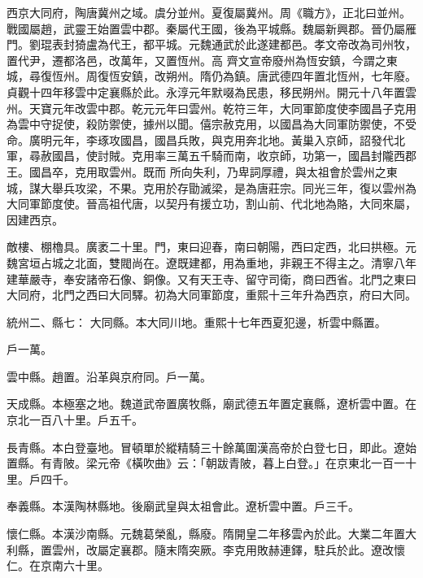 
\begin{pinyinscope}

 西京大同府，陶唐冀州之域。虞分並州。夏復屬冀州。周《職方》，正北曰並州。戰國屬趙，武靈王始置雲中郡。秦屬代王國，後為平城縣。魏屬新興郡。晉仍屬雁門。劉琨表封猗盧為代王，都平城。元魏通武於此遂建都邑。孝文帝改為司州牧，置代尹，遷都洛邑，改萬年，又置恆州。高
 齊文宣帝廢州為恆安鎮，今謂之東城，尋復恆州。周復恆安鎮，改朔州。隋仍為鎮。唐武德四年置北恆州，七年廢。貞觀十四年移雲中定襄縣於此。永淳元年默啜為民患，移民朔州。開元十八年置雲州。天寶元年改雲中郡。乾元元年曰雲州。乾符三年，大同軍節度使李國昌子克用為雲中守捉使，殺防禦使，據州以聞。僖宗赦克用，以國昌為大同軍防禦使，不受命。廣明元年，李琢攻國昌，國昌兵敗，與克用奔北地。黃巢入京師，詔發代北軍，尋赦國昌，使討賊。克用率三萬五千騎而南，收京師，功第一，國昌封隴西郡王。國昌卒，克用取雲州。既而
 所向失利，乃卑詞厚禮，與太祖會於雲州之東城，謀大舉兵攻梁，不果。克用於存勖滅梁，是為唐莊宗。同光三年，復以雲州為大同軍節度使。晉高祖代唐，以契丹有援立功，割山前、代北地為賂，大同來屬，因建西京。



 敵樓、棚櫓具。廣袤二十里。門，東曰迎春，南曰朝陽，西曰定西，北曰拱極。元魏宮垣占城之北面，雙閥尚在。遼既建都，用為重地，非親王不得主之。清寧八年建華嚴寺，奉安諸帝石像、銅像。又有天王寺、留守司衛，商曰西省。北門之東曰大同府，北門之西曰大同驛。初為大同軍節度，重熙十三年升為西京，府曰大同。



 統州二、縣七：
 大同縣。本大同川地。重熙十七年西夏犯邊，析雲中縣置。



 戶一萬。



 雲中縣。趙置。沿革與京府同。戶一萬。



 天成縣。本極塞之地。魏道武帝置廣牧縣，廟武德五年置定襄縣，遼析雲中置。在京北一百八十里。戶五千。



 長青縣。本白登臺地。冒頓單於縱精騎三十餘萬圍漢高帝於白登七日，即此。遼始置縣。有青陂。梁元帝《橫吹曲》云：「朝跋青陂，暮上白登。」在京東北一百一十
 里。戶四千。



 奉義縣。本漢陶林縣地。後廟武皇與太祖會此。遼析雲中置。戶三千。



 懷仁縣。本漢沙南縣。元魏葛榮亂，縣廢。隋開皇二年移雲內於此。大業二年置大利縣，置雲州，改屬定襄郡。隨末隋突厥。李克用敗赫連鐸，駐兵於此。遼改懷仁。在京南六十里。




\end{pinyinscope}
